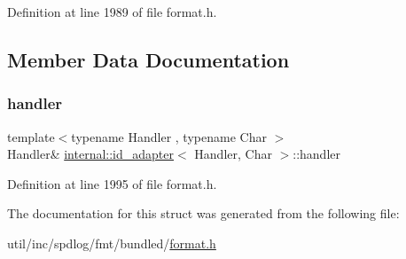 Definition at line 1989 of file format.\+h.



\subsection{Member Data Documentation}
\mbox{\label{structinternal_1_1id__adapter_a0db6b62cfd71e15f58fc5006d5cbd54e}} 
\subsubsection{\texorpdfstring{handler}{handler}}
{\footnotesize\ttfamily template$<$typename Handler , typename Char $>$ \\
Handler\& \hyperlink{structinternal_1_1id__adapter}{internal\+::id\+\_\+adapter}$<$ Handler, Char $>$\+::handler}



Definition at line 1995 of file format.\+h.



The documentation for this struct was generated from the following file\+:\begin{DoxyCompactItemize}
\item 
util/inc/spdlog/fmt/bundled/\hyperlink{format_8h}{format.\+h}\end{DoxyCompactItemize}
